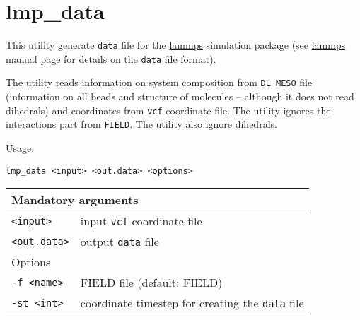 \section{lmp\_data} \label{sec:lmp_data}

This utility generate \texttt{data} file for the
\href{https://lammps.sandia.gov/}{lammps} simulation package (see
\href{https://lammps.sandia.gov/}{lammps manual page} for details on the
\texttt{data} file format).

The utility reads information on system composition from \texttt{DL\_MESO}
file (information on all beads and structure of molecules -- although it
does not read dihedrals) and coordinates from \texttt{vcf} coordinate file.
The utility ignores the interactions part from \texttt{FIELD}. The utility
also ignore dihedrals.

Usage:

\vspace{1em}
\noindent
\texttt{lmp\_data <input> <out.data> <options>}

\noindent
\begin{longtable}{p{}p{}}
  \toprule
  \multicolumn{2}{l}{Mandatory arguments} \\
  \midrule
  \texttt{<input>} & input \texttt{vcf} coordinate file \\
  \texttt{<out.data>} & output \texttt{data} file \\
  \toprule
  \multicolumn{2}{l}{Options} \\
  \midrule
  \texttt{-f <name>} & FIELD file (default: FIELD)\\
  \texttt{-st <int>} & coordinate timestep for creating the \texttt{data}
  file \\
  \bottomrule
\end{longtable}
